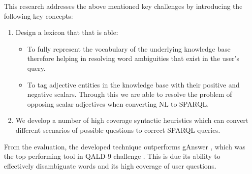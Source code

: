 \documentclass[review]{elsarticle}
\begin{document}
\par This research addresses the above mentioned key challenges by introducing the following key concepts:
\begin{enumerate}
\item  Design a lexicon that that is able:
\begin{itemize}
\item To fully represent the vocabulary of the underlying knowledge base therefore helping in resolving word ambiguities that exist in the user's query.
\item To tag adjective entities in the knowledge base with their positive and negative scalars. Through this we are able to resolve the problem of opposing scalar adjectives when converting NL to SPARQL.
\end{itemize}
\item We develop  a number of high coverage  syntactic heuristics which can convert different scenarios of possible questions  to   correct SPARQL queries. 
\end{enumerate}
From the evaluation, the developed technique outperforms gAnswer \citep{g2018}, which was the top performing tool in QALD-9 challenge \citep{quad9}. This is due its  ability to effectively disambiguate  words and its high coverage of user questions.
\end{document}

